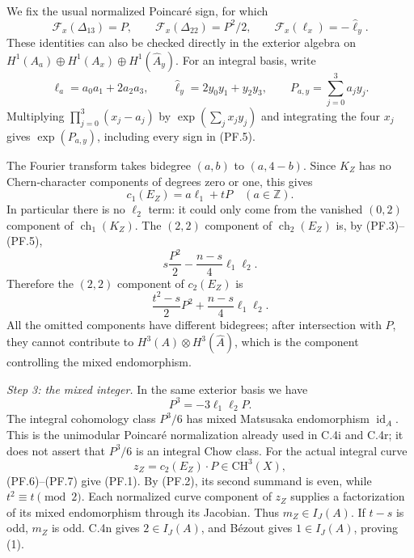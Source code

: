 We fix the usual normalized Poincar\'e sign, for which
\[
 \mathcal F_x(\Delta_{13})=P,\qquad
 \mathcal F_x(\Delta_{22})=P^2/2,\qquad
 \mathcal F_x(\ell_x)=-\widehat\ell_y.
                                                               \tag{PF.5}
\]
These identities can also be checked directly in the exterior
algebra on $H^1(A_a)\oplus H^1(A_x)\oplus H^1(\widehat A_y)$.
For an integral basis, write
\[
 \ell_a=a_0a_1+2a_2a_3,\qquad
 \widehat\ell_y=2y_0y_1+y_2y_3,\qquad
 P_{a,y}=\sum_{j=0}^3a_jy_j.
\]
Multiplying $\prod_{j=0}^3(x_j-a_j)$ by
$\exp(\sum_jx_jy_j)$ and integrating the four $x_j$ gives
$\exp(P_{a,y})$, including every sign in (PF.5).

The Fourier transform takes bidegree $(a,b)$ to $(a,4-b)$.
Since $K_Z$ has no Chern-character components of degrees zero
or one, this gives
\[
                c_1(E_Z)=a\ell_1+tP\quad (a\in\mathbb Z).
\]
In particular there is no $\ell_2$ term: it could only come
from the vanished $(0,2)$ component of $\operatorname{ch}_1(K_Z)$.
The $(2,2)$ component of $\operatorname{ch}_2(E_Z)$ is, by
(PF.3)--(PF.5),
\[
                s\frac{P^2}{2}-\frac{n-s}{4}\ell_1\ell_2.
\]
Therefore the $(2,2)$ component of $c_2(E_Z)$ is
\[
               \frac{t^2-s}{2}P^2+\frac{n-s}{4}\ell_1\ell_2.
                                                               \tag{PF.6}
\]
All the omitted components have different bidegrees; after
intersection with $P$, they cannot contribute to
$H^3(A)\otimes H^3(\widehat A)$, which is the component controlling
the mixed endomorphism.

\emph{Step 3: the mixed integer.}
In the same exterior basis we have
\[
                         P^3=-3\ell_1\ell_2P.          \tag{PF.7}
\]
The integral cohomology class $P^3/6$ has mixed Matsusaka
endomorphism $\operatorname{id}_A$. This is the unimodular
Poincar\'e normalization already used in C.4i and C.4r; it
does not assert that $P^3/6$ is an integral Chow class.
For the actual integral curve
\[
                              z_Z=c_2(E_Z)\cdot P
                                       \in\mathrm{CH}^3(X),
\]
(PF.6)--(PF.7) give (PF.1). By (PF.2), its second summand is
even, while $t^2\equiv t\pmod2$.
Each normalized curve component of $z_Z$ supplies a factorization
of its mixed endomorphism through its Jacobian. Thus
$m_Z\in I_J(A)$. If $t-s$ is odd, $m_Z$ is odd. C.4n gives
$2\in I_J(A)$, and B\'ezout gives $1\in I_J(A)$, proving (1).

